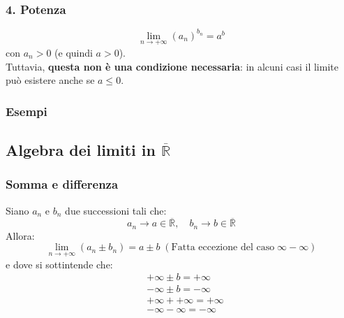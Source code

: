 \subsubsection{4. Potenza}\label{potenza}
\[
   \lim_{n \to +\infty} (a_n)^{b_n} = a^{b}
\]
con \(a_n > 0\) (e quindi \(a > 0\)).\\
Tuttavia, \textbf{questa non è una condizione necessaria}: in alcuni
casi il limite può esistere anche se \(a \le 0\).

\subsubsection{Esempi}\label{esempi}

\ex{
\[\lim_{ n \to +\infty } \frac{n}{n+1}=\lim_{ n \to +\infty } \frac{n+1-1}{n+1}=\frac{n+1}{n+1} -\frac{1}{n+1}=\lim_{ n \to +\infty } 1 - \lim_{ n \to +\infty } \frac{1}{n+1} = 1- 0 = 1\]
}

\ex{
\[\lim_{ n \to +\infty } \frac{(-1)^n + \sqrt{n}}{n} = \lim_{ n \to +\infty } \frac{(-1)^n}{n} + \lim_{ n \to +\infty } \frac{\sqrt{n}}{n} = 0 + 0 = 0\]
}

\ex{
\[\lim_{n \to +\infty} \frac{n^2 + 3n - 1}{2n - 3} = \lim_{n \to +\infty} \frac{n^2\left(1 + \frac{3}{n} - \frac{1}{n^2}\right)}{n\left(2 - \frac{3}{n}\right)} = \lim_{n \to +\infty} \frac{n\left(1 + \frac{3}{n} - \frac{1}{n^2}\right)}{2 - \frac{3}{n}} = +\infty\]
}

\subsection{Algebra dei limiti in \texorpdfstring{$\overline{\mathbb{R}}$}{R esteso}}\label{algebra-dei-limiti-versione-2}

\subsubsection{Somma e differenza}

Siano \(a_n\) e \(b_n\) due successioni tali che:
\[a_n \to a \in \overline{\mathbb{R}}, \quad b_n \to b \in \overline{\mathbb{R}}\]
Allora: \[
\lim_{n \to +\infty} (a_n \pm b_n) = a \pm b \;(\text{Fatta eccezione del caso}\;
\infty-\infty)
\] e dove si sottintende che: 
\begin{align}
& +\infty \pm b = +\infty \\
& -\infty \pm b = -\infty\\
& +\infty + +\infty = +\infty\\
& -\infty - \infty = -\infty
\end{align}

